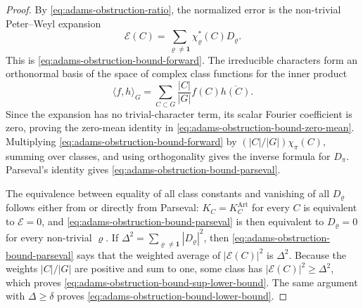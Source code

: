 \documentclass[11pt,a4paper]{amsart}
\theoremstyle{plain}
\theoremstyle{definition}
\theoremstyle{remark}
\begin{document}
\begin{proof}
  By \eqref{eq:adams-obstruction-ratio}, the normalized error is the
  non-trivial Peter--Weyl expansion
  \[
    \mathcal E(C)=
    \sum_{\varrho\neq\mathbf1}\chi_\varrho^\ast(C)D_\varrho.
  \]
  This is \eqref{eq:adams-obstruction-bound-forward}.
  The irreducible characters form an orthonormal basis of the space of
  complex class functions for the inner product
  \[
    \langle f,h\rangle_G
    =
    \sum_{C\subset G}\frac{|C|}{|G|}f(C)\overline{h(C)}.
  \]
  Since the expansion has no trivial-character term, its scalar Fourier
  coefficient is zero, proving the zero-mean identity in
  \eqref{eq:adams-obstruction-bound-zero-mean}.  Multiplying
  \eqref{eq:adams-obstruction-bound-forward} by
  \((|C|/|G|)\chi_\pi(C)\), summing over classes, and using orthogonality
  gives the inverse formula for \(D_\pi\).  Parseval's identity gives
  \eqref{eq:adams-obstruction-bound-parseval}.

  The equivalence between equality of all class constants and vanishing of
  all \(D_\varrho\) follows either from
   or directly from Parseval:
  \(K_C=K_C^{\mathrm{Art}}\) for every \(C\) is equivalent to
  \(\mathcal E=0\), and \eqref{eq:adams-obstruction-bound-parseval} is then
  equivalent to \(D_\varrho=0\) for every non-trivial \(\varrho\).  If
  \(\Delta^2=\sum_{\varrho\neq\mathbf1}|D_\varrho|^2\), then
  \eqref{eq:adams-obstruction-bound-parseval} says that the weighted
  average of \(|\mathcal E(C)|^2\) is \(\Delta^2\). Because the weights
  \(|C|/|G|\) are positive and sum to one, some class has
  \(|\mathcal E(C)|^2\ge\Delta^2\), which proves
  \eqref{eq:adams-obstruction-bound-sup-lower-bound}.  The same argument
  with \(\Delta\ge\delta\) proves
  \eqref{eq:adams-obstruction-bound-lower-bound}.
\end{proof}
\end{document}
